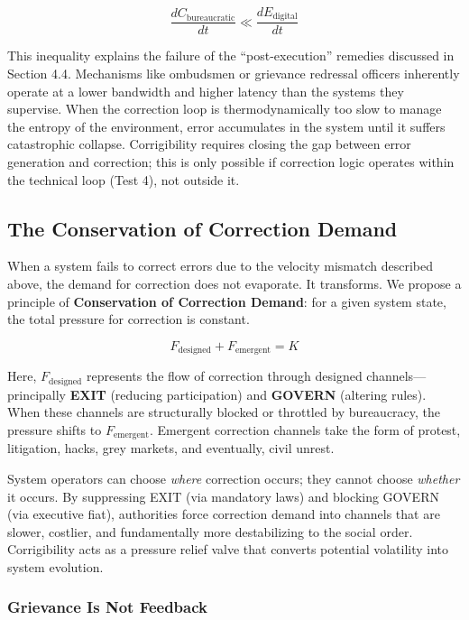 \documentclass{article}
\begin{document}
\begin{equation}
\frac{dC_{\text{bureaucratic}}}{dt} \ll \frac{dE_{\text{digital}}}{dt}
\end{equation}

This inequality explains the failure of the ``post-execution'' remedies discussed in Section 4.4. Mechanisms like ombudsmen or grievance redressal officers inherently operate at a lower bandwidth and higher latency than the systems they supervise. When the correction loop is thermodynamically too slow to manage the entropy of the environment, error accumulates in the system until it suffers catastrophic collapse. Corrigibility requires closing the gap between error generation and correction; this is only possible if correction logic operates within the technical loop (Test 4), not outside it.

\subsection{The Conservation of Correction Demand}

When a system fails to correct errors due to the velocity mismatch described above, the demand for correction does not evaporate. It transforms. We propose a principle of \textbf{Conservation of Correction Demand}: for a given system state, the total pressure for correction is constant.

\begin{equation}
F_{\text{designed}} + F_{\text{emergent}} = K
\end{equation}

Here, $F_{\text{designed}}$ represents the flow of correction through designed channels---principally \textbf{EXIT} (reducing participation) and \textbf{GOVERN} (altering rules). When these channels are structurally blocked or throttled by bureaucracy, the pressure shifts to $F_{\text{emergent}}$. Emergent correction channels take the form of protest, litigation, hacks, grey markets, and eventually, civil unrest.

System operators can choose \textit{where} correction occurs; they cannot choose \textit{whether} it occurs. By suppressing EXIT (via mandatory laws) and blocking GOVERN (via executive fiat), authorities force correction demand into channels that are slower, costlier, and fundamentally more destabilizing to the social order. Corrigibility acts as a pressure relief valve that converts potential volatility into system evolution.

\subsubsection{Grievance Is Not Feedback}
\end{document}
